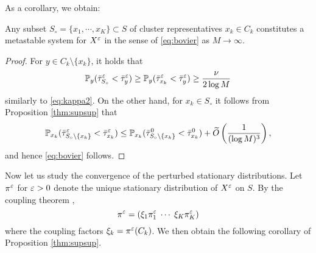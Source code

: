 As a corollary, we obtain:
\begin{cor}
Any subset $S_\circ=\{x_1,\cdots,x_K\}\subset S$ of cluster representatives $x_k\in C_k$ constitutes a metastable system for $X^\varepsilon$ in the sense of \eqref{eq:bovier} as $M\to\infty$.
\end{cor}

\begin{proof}
For $y\in C_k\setminus\{x_k\}$, it holds that
\begin{equation*}
\mathbb{P}_y(\bar{\tau}_{S_\circ}^\varepsilon < \bar{\tau}_y^\varepsilon) \ge \mathbb{P}_y(\bar{\tau}_{x_k}^\varepsilon < \bar{\tau}_y^\varepsilon) \ge \frac{\nu}{2\log M}
\end{equation*}
similarly to \eqref{eq:kappa2}. On the other hand, for $x_k\in S_\circ$ it follows from Proposition \ref{thm:supsup} that
\begin{equation*}
\mathbb{P}_{x_k}(\bar{\tau}_{S_\circ\setminus\{x_k\}}^\varepsilon < \bar{\tau}_{x_k}^\varepsilon) \le \mathbb{P}_{x_k}(\bar{\tau}_{S_\circ\setminus\{x_k\}}^0 < \bar{\tau}_{x_k}^0) + \widetilde{O}\left(\frac{1}{(\log M)^3}\right),
\end{equation*}
and hence \eqref{eq:bovier} follows.
\end{proof}

Now let us study the convergence of the perturbed stationary distributions. Let $\pi^\varepsilon$ for $\varepsilon>0$ denote the unique stationary distribution of $X^\varepsilon$ on $S$. By the coupling theorem \citep[Theorem 4.1]{Meyer89}, 
\begin{equation}\label{eq:coupling}
\pi^\varepsilon = (\xi_1\pi_1^\varepsilon \;\cdots\; \xi_K\pi_K^\varepsilon)
\end{equation}
where the coupling factors $\xi_k= \pi^\varepsilon(C_k)$. We then obtain the following corollary of Proposition \ref{thm:supsup}.


